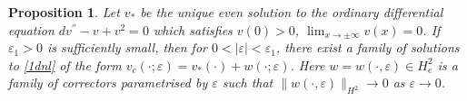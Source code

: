 \documentclass[letterpaper,11pt]{article}
\newcommand{\R}{\mathbb{R}}
\newcommand{\eps}{\varepsilon}
\numberwithin{equation}{section}
\theoremstyle{plain}
\newtheorem{proposition}[theorem]{Proposition}
\theoremstyle{remark}
\begin{document}
\begin{proposition}\label{prop} Let $v_*$ be the unique even solution to the ordinary differential equation $dv^{''} - v +v^2 = 0$ which satisfies $v(0)>0$, $\lim_{x\to \pm \infty} v(x) = 0$. If $\eps_1>0$ is sufficiently small, then for $0<|\eps|<\eps_1$, there exist a family of solutions to \eqref{1dnl} of the form $v_c(\cdot;\eps) = v_*(\cdot)+w(\cdot; \eps)$. Here $w=w(\cdot,\eps) \in H^2_{e}$ is a family of correctors parametrised by $\eps $ such that $\|w(\cdot,\eps)\|_{H^2} \to 0$ as $\eps \to 0$.
\end{proposition}





\end{document}
